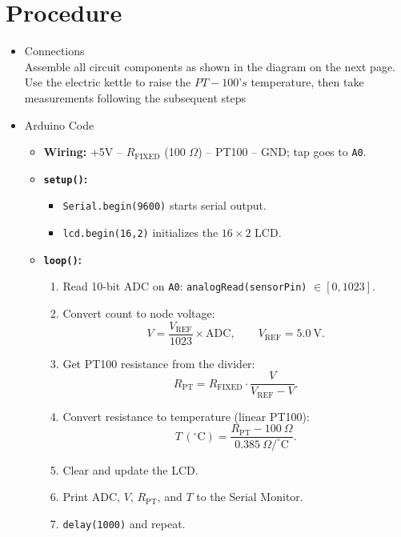 \documentclass[journal]{IEEEtran}
\begin{document}
\section{Procedure}
\begin{itemize}
    
\item Connections\\
Assemble all circuit components as shown in the diagram on the next page. Use the electric kettle to raise the $PT-100’s$ temperature, then take measurements following the subsequent steps
\item Arduino Code \\
\begin{itemize}
  \item \textbf{Wiring:} +5V -- $R_{\text{FIXED}}$ (100 $\Omega$) -- PT100 -- GND; tap goes to \texttt{A0}.
  \item \textbf{\texttt{setup()}:}
    \begin{itemize}
      \item \texttt{Serial.begin(9600)} starts serial output.
      \item \texttt{lcd.begin(16,2)} initializes the $16\times2$ LCD.
    \end{itemize}
  \item \textbf{\texttt{loop()}:}
    \begin{enumerate}
      \item Read 10-bit ADC on \texttt{A0}: \texttt{analogRead(sensorPin)} $\in[0,1023]$.
      \item Convert count to node voltage:
            \[
              V=\frac{V_{\mathrm{REF}}}{1023}\times \text{ADC},\qquad V_{\mathrm{REF}}=5.0~\text{V}.
            \]
      \item Get PT100 resistance from the divider:
            \[
              R_{\mathrm{PT}}=R_{\mathrm{FIXED}}\cdot\frac{V}{V_{\mathrm{REF}}-V}.
            \]
      \item Convert resistance to temperature (linear PT100):
            \[
              T\,(^{\circ}\mathrm{C})=\frac{R_{\mathrm{PT}}-100~\Omega}{0.385~\Omega/^{\circ}\mathrm{C}}.
            \]
      \item Clear and update the LCD.
      \item Print ADC, $V$, $R_{\mathrm{PT}}$, and $T$ to the Serial Monitor.
      \item \texttt
      {delay(1000)} and repeat.
    \end{enumerate}
\end{itemize}
\end{itemize}
\end{document}
